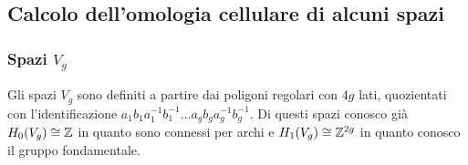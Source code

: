 \subsection{Calcolo dell'omologia cellulare di alcuni spazi}

\subsubsection{Spazi $ V_g $}

Gli spazi $ V_g $ sono definiti a partire dai poligoni
regolari con $ 4g $ lati, quozientati con l'identificazione
$ a_1 b_1 a_1^{-1} b_1^{-1} \dots a_g b_g a_g^{-1} b_g^{-1} $.
Di questi spazi conosco già $ H_0(V_g) \cong \mathbb{Z} $ in quanto
sono connessi per archi e $ H_1(V_g) \cong \mathbb{Z}^{2g} $ in quanto
conosco il gruppo fondamentale.

